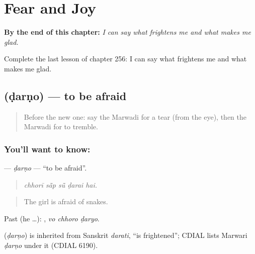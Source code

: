 
\chapter{Fear and Joy}
\label{ch:mw-fear-and-joy}

\begin{chapteropening}
\textbf{By the end of this chapter:} \emph{I can say what frightens me and what makes me glad.}

Complete the last lesson of chapter 256: I can say what frightens me and what makes me glad.
\end{chapteropening}

\section[\texorpdfstring{\mw{डरणो} (ḍarṇo)}{डरणो (ḍarṇo)}]{ (ḍarṇo) — to be afraid}

\label{lesson:MW-C256-darno}



\begin{quote}
Before the new one: say the Marwadi for a tear (from the eye), then the Marwadi for to tremble.
\end{quote}

\subsection*{You'll want to know: }
\textbf{} — \emph{ḍarṇo} — \textquotedblleft{}to be afraid\textquotedblright{}.

\begin{quote}
    
\end{quote}

\begin{quote}
\emph{chhorī sā̃p sū̃ ḍarai hai.}
\end{quote}

\begin{quote}
The girl is afraid of snakes.
\end{quote}

Past (he …):   , \emph{vo chhoro ḍaryo}.

\begin{cousinweb}
\textbf{} (\emph{ḍarṇo}) is inherited from Sanskrit \emph{darati}, \textquotedblleft{}is frightened\textquotedblright{}; CDIAL lists Marwari \emph{ḍarṇo} under it (CDIAL 6190).
\end{cousinweb}

